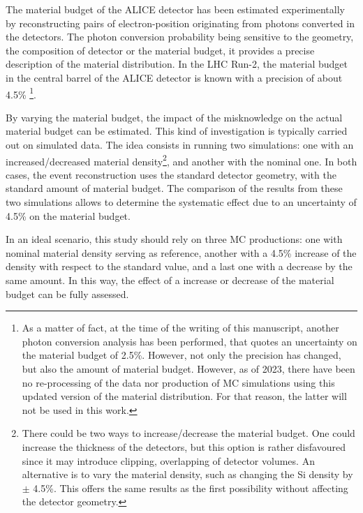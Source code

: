 The material budget of the ALICE detector has been estimated experimentally by reconstructing pairs of electron-position originating from photons converted in the detectors. The photon conversion probability being sensitive to the geometry, the composition of detector or the material budget, it provides a precise description of the material distribution. In the LHC Run-2, the material budget in the central barrel of the ALICE detector is known with a precision of about 4.5\% \cite{alicecollaborationPerformanceALICEExperiment2014}\cite{alicecollaborationValidationALICEMaterial2022}\footnote{As a matter of fact, at the time of the writing of this manuscript, another photon conversion analysis \cite{alicecollaborationDatadrivenPrecisionDetermination2023} has been performed, that quotes an uncertainty on the material budget of 2.5\%. However, not only the precision has changed, but also the amount of material budget. However, as of 2023, there have been no re-processing of the data nor production of MC simulations using this updated version of the material distribution. For that reason, the latter will not be used in this work.}. 


By varying the material budget, the impact of the misknowledge on the actual material budget can be estimated. This kind of investigation is typically carried out on simulated data. The idea consists in running two simulations: one with an increased/decreased material density\footnote{There could be two ways to increase/decrease the material budget. One could increase the thickness of the detectors, but this option is rather disfavoured since it may introduce clipping, overlapping of detector volumes. An alternative is to vary the material density, such as changing the Si density by $\pm$ 4.5\%. This offers the same results as the first possibility without affecting the detector geometry.}, and another with the nominal one. In both cases, the event reconstruction uses the standard detector geometry, \ie with the standard amount of material budget. The comparison of the results from these two simulations allows to determine the systematic effect due to an uncertainty of 4.5\% on the material budget.

In an ideal scenario, this study should rely on three MC productions: one with nominal material density serving as reference, another with a 4.5\% increase of the density with respect to the standard value, and a last one with a decrease by the same amount. In this way, the effect of a increase or decrease of the material budget can be fully assessed. 

